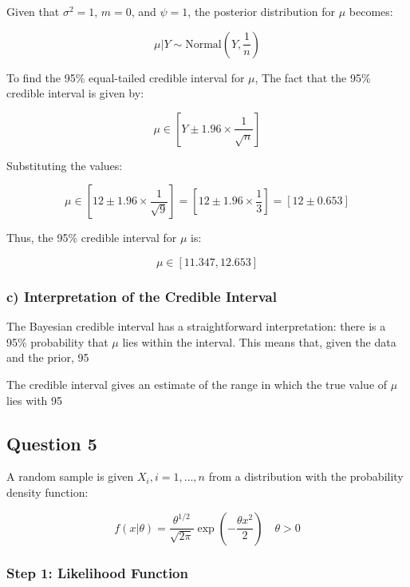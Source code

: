 \documentclass{article}
\begin{document}
Given that \( \sigma^2 = 1 \), \( m = 0 \), and \( \psi = 1 \), the posterior distribution for \( \mu \) becomes:

\[
\mu | Y \sim \text{Normal} \left( Y, \frac{1}{n} \right)
\]

To find the 95\% equal-tailed credible interval for \( \mu \), The fact that the 95\% credible interval is given by:

\[
\mu \in \left[ Y \pm 1.96 \times \frac{1}{\sqrt{n}} \right]
\]

Substituting the values:

\[
\mu \in \left[ 12 \pm 1.96 \times \frac{1}{\sqrt{9}} \right] = \left[ 12 \pm 1.96 \times \frac{1}{3} \right] = \left[ 12 \pm 0.653 \right]
\]

Thus, the 95\% credible interval for \( \mu \) is:

\[
\mu \in [11.347, 12.653]
\]

\subsubsection*{c) Interpretation of the Credible Interval}

The Bayesian credible interval has a straightforward interpretation: there is a 95\% probability that \( \mu \) lies within the interval. This means that, given the data and the prior, 95%

The credible interval gives an estimate of the range in which the true value of \( \mu \) lies with 95%


\subsection*{Question 5}

A random sample is given \( X_i, i = 1, \dots, n \) from a distribution with the probability density function:

\[
f(x | \theta) = \frac{\theta^{1/2}}{\sqrt{2\pi}} \exp \left( -\frac{\theta x^2}{2} \right) \quad \theta > 0
\]

\subsubsection*{Step 1: Likelihood Function}
\end{document}

